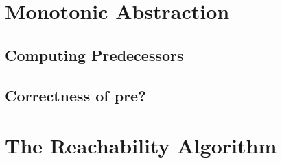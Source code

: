 \section{Monotonic Abstraction}


\subsection{Computing Predecessors}

\subsection{Correctness of pre?}

\section{The Reachability Algorithm}




